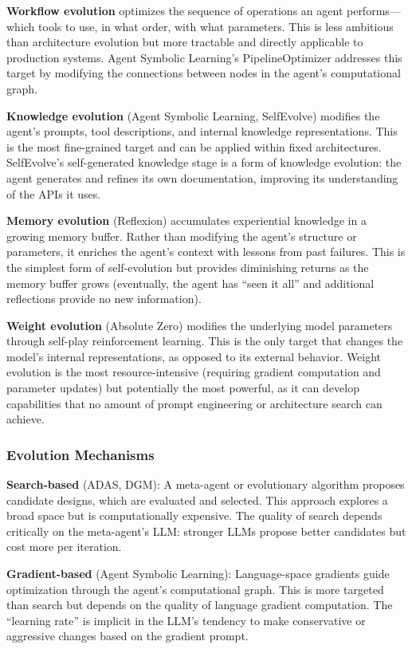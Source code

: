 \textbf{Workflow evolution} optimizes the sequence of operations an agent performs---which tools to use, in what order, with what parameters. This is less ambitious than architecture evolution but more tractable and directly applicable to production systems. Agent Symbolic Learning's PipelineOptimizer addresses this target by modifying the connections between nodes in the agent's computational graph.

\textbf{Knowledge evolution} (Agent Symbolic Learning, SelfEvolve) modifies the agent's prompts, tool descriptions, and internal knowledge representations. This is the most fine-grained target and can be applied within fixed architectures. SelfEvolve's self-generated knowledge stage is a form of knowledge evolution: the agent generates and refines its own documentation, improving its understanding of the APIs it uses.

\textbf{Memory evolution} (Reflexion) accumulates experiential knowledge in a growing memory buffer. Rather than modifying the agent's structure or parameters, it enriches the agent's context with lessons from past failures. This is the simplest form of self-evolution but provides diminishing returns as the memory buffer grows (eventually, the agent has ``seen it all'' and additional reflections provide no new information).

\textbf{Weight evolution} (Absolute Zero) modifies the underlying model parameters through self-play reinforcement learning. This is the only target that changes the model's internal representations, as opposed to its external behavior. Weight evolution is the most resource-intensive (requiring gradient computation and parameter updates) but potentially the most powerful, as it can develop capabilities that no amount of prompt engineering or architecture search can achieve.

\subsubsection{Evolution Mechanisms}

\textbf{Search-based} (ADAS, DGM): A meta-agent or evolutionary algorithm proposes candidate designs, which are evaluated and selected. This approach explores a broad space but is computationally expensive. The quality of search depends critically on the meta-agent's LLM: stronger LLMs propose better candidates but cost more per iteration.

\textbf{Gradient-based} (Agent Symbolic Learning): Language-space gradients guide optimization through the agent's computational graph. This is more targeted than search but depends on the quality of language gradient computation. The ``learning rate'' is implicit in the LLM's tendency to make conservative or aggressive changes based on the gradient prompt.

